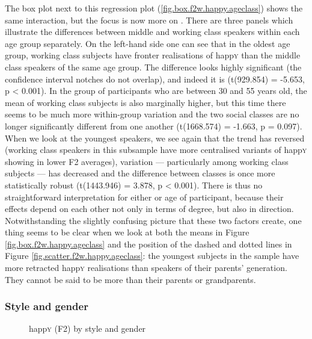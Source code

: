 The box plot next to this regression plot (\ref{fig.box.f2w.happy.ageclass}) shows the same interaction, but the focus is now more on .
There are three panels which illustrate the differences between middle and working class speakers within each age group separately.
On the left-hand side one can see that in the oldest age group, working class subjects have fronter realisations of happ\textsc{y} than the middle class speakers of the same age group.
The difference looks highly significant (the confidence interval notches do not overlap), and indeed it is (t(929.854) = -5.653, p < 0.001).
In the group of participants who are between 30 and 55 years old, the mean of working class subjects is also marginally higher, but this time there seems to be much more within-group variation and the two social classes are no longer significantly different from one another (t(1668.574) = -1.663, p = 0.097).
When we look at the youngest speakers, we see again that the trend has reversed (working class speakers in this subsample have more centralised variants of happ\textsc{y} showing in lower F2 averages), variation --- particularly among working class subjects --- has decreased and the difference between classes is once more statistically robust (t(1443.946) = 3.878, p < 0.001).
There is thus no straightforward interpretation for either  or age of participant, because their effects depend on each other not only in terms of degree, but also in direction.
Notwithstanding the slightly confusing picture that these two factors create, one thing seems to be clear when we look at both the means in Figure \ref{fig.box.f2w.happy.ageclass} and the position of the dashed and dotted lines in Figure \ref{fig.scatter.f2w.happy.ageclass}: the youngest subjects in the sample have more retracted happ\textsc{y} realisations than speakers of their parents' generation.
They cannot be said to be more  than their parents or grandparents.

\subsubsection{Style and gender}
\label{sec.prod.res.vow.happy.f2.stylegender}

\begin{figure}[h!]
	\centering
		\resizebox{.49\linewidth}{!}{} 
	\caption{happ\textsc{y} (F2) by style and gender}
	\label{fig.box.f2w.happy.stylegender}
\end{figure}

